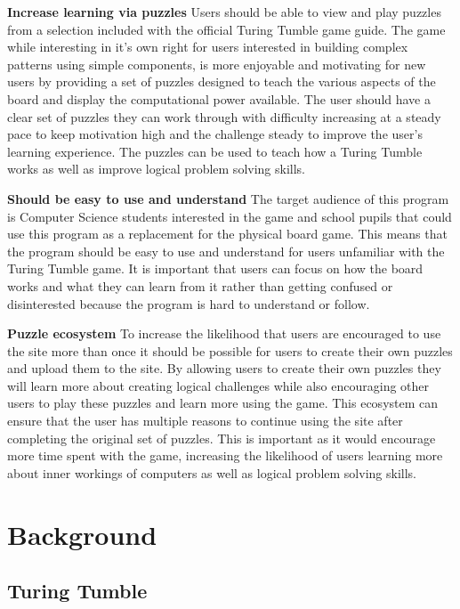 \documentclass{l4proj}
\begin{document}
\textbf{Increase learning via puzzles} Users should be able to view and play puzzles from a selection included with the official Turing Tumble game guide. The game while interesting in it's own right for users interested in building complex patterns using simple components, is more enjoyable and motivating for new users by providing a set of puzzles designed to teach the various aspects of the board and display the computational power available. The user should have a clear set of puzzles they can work through with difficulty increasing at a steady pace to keep motivation high and the challenge steady to improve the user's learning experience. The puzzles can be used to teach how a Turing Tumble works as well as improve logical problem solving skills.    

\textbf{Should be easy to use and understand} The target audience of this program is Computer Science students interested in the game and school pupils that could use this program as a replacement for the physical board game. This means that the program should be easy to use and understand for users unfamiliar with the Turing Tumble game. It is important that users can focus on how the board works and what they can learn from it rather than getting confused or disinterested because the program is hard to understand or follow. 

\textbf{Puzzle ecosystem} To increase the likelihood that users are encouraged to use the site more than once it should be possible for users to create their own puzzles and upload them to the site. By allowing users to create their own puzzles they will learn more about creating logical challenges while also encouraging other users to play these puzzles and learn more using the game. This ecosystem can ensure that the user has multiple reasons to continue using the site after completing the original set of puzzles. This is important as it would encourage more time spent with the game, increasing the likelihood of users learning more about inner workings of computers as well as logical problem solving skills. 

\chapter{Background}
\section{Turing Tumble}
\label{section:background}
\end{document}
